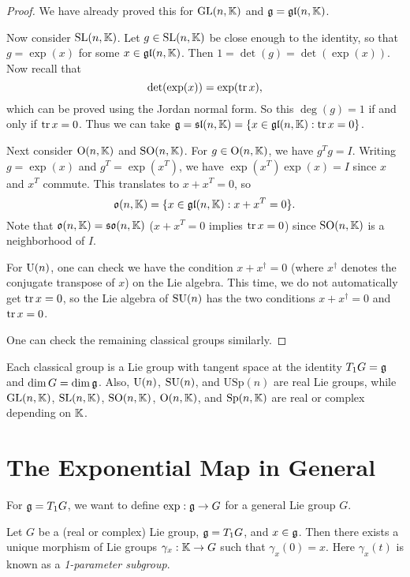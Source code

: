 \begin{proof}
  We have already proved this for
  $\operatorname{GL}(n, \mathbb{K})$ and $\mathfrak{g} = \mathfrak{gl}(n, \mathbb{K})$.

  Now consider $\operatorname{SL}(n, \mathbb{K})$. Let
  $g \in \operatorname{SL}(n, \mathbb{K})$ be close enough
  to the identity, so that
  $g = \exp(x)$ for some $x \in \mathfrak{gl}(n, \mathbb{K})$.
  Then $1 = \det(g) = \det(\exp(x))$.
  Now recall that
  \[
    \det(\exp(x)) = \exp(\operatorname{tr} x),
  \]
  which can be proved using the
  Jordan normal form. So this
  $\deg(g) = 1$ if and only if
  $\operatorname{tr} x = 0$. Thus we can take
  $\mathfrak{g} = \mathfrak{sl}(n, \mathbb{K}) = \{x \in \mathfrak{gl}(n, \mathbb{K}) : \operatorname{tr} x = 0\}$.

  Next consider $\operatorname{O}(n, \mathbb{K})$
  and $\operatorname{SO}(n, \mathbb{K})$. For
  $g \in \operatorname{O}(n, \mathbb{K})$, we have
  $g^T g = I$.
  Writing $g = \exp(x)$ and
  $g^T = \exp(x^T)$, we have
  $\exp(x^T) \exp(x) = I$
  since $x$ and $x^T$ commute.
  This translates to
  $x + x^T = 0$, so
  \[\mathfrak{o}(n, \mathbb{K}) = \{x \in \mathfrak{gl}(n, \mathbb{K}) : x + x^T = 0\}.\]
  Note that
  $\mathfrak{o}(n, \mathbb{K}) = \mathfrak{so}(n, \mathbb{K})$
  ($x + x^T = 0$ implies $\operatorname{tr} x = 0$)
  since $\operatorname{SO}(n, \mathbb{K})$ is a neighborhood
  of $I$.

  For $\operatorname{U}(n)$, one can check
  we have the condition
  $x + x^\dagger = 0$
  (where $x^\dagger$ denotes the
  conjugate transpose of $x$)
  on the Lie algebra. This time,
  we do not automatically get
  $\operatorname{tr} x = 0$, so the Lie algebra
  of $\operatorname{SU}(n)$ has the
  two conditions
  $x + x^\dagger = 0$ and $\operatorname{tr} x = 0$.

  One can check the remaining
  classical groups similarly.
\end{proof}

\begin{corollary}
  Each classical group is a Lie group
  with tangent space at the identity
  $T_1 G = \mathfrak{g}$
  and $\dim G = \dim \mathfrak{g}$. Also,
  $\operatorname{U}(n)$, $\operatorname{SU}(n)$, and $\mathrm{USp}(n)$
  are real Lie groups, while
  $\operatorname{GL}(n, \mathbb{K})$, $\operatorname{SL}(n, \mathbb{K})$,
  $\operatorname{SO}(n, \mathbb{K})$, $\operatorname{O}(n, \mathbb{K})$,
  and $\operatorname{Sp}(n, \mathbb{K})$ are real or complex
  depending on $\mathbb{K}$.
\end{corollary}

\section{The Exponential Map in General}

\begin{remark}
  For $\mathfrak{g} = T_1 G$, we want to
  define $\exp : \mathfrak{g} \to G$ for a
  general Lie group $G$.
\end{remark}

\begin{prop}
  Let $G$ be a (real or complex) Lie
  group, $\mathfrak{g} = T_1 G$, and
  $x \in \mathfrak{g}$. Then there exists a unique
  morphism of Lie groups
  $\gamma_x : \mathbb{K} \to G$
  such that $\gamma_x(0) = x$.
  Here $\gamma_x(t)$ is known as
  a \emph{1-parameter subgroup}.
\end{prop}

